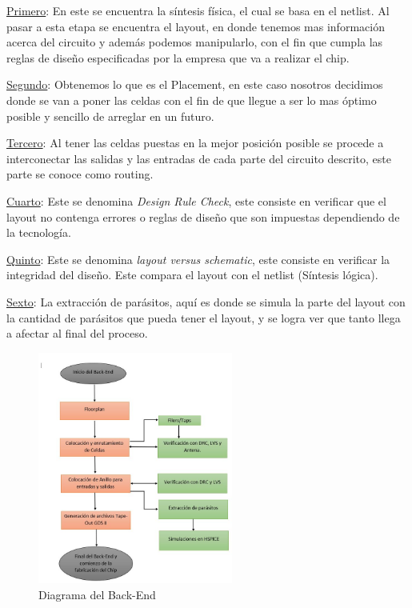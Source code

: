 \underline{Primero}: En este se encuentra la síntesis física, el cual se basa en el netlist. Al pasar a esta etapa se encuentra el layout, en donde tenemos mas información acerca del circuito y además podemos manipularlo, con el fin que cumpla las reglas de diseño especificadas por la empresa que va a realizar el chip.

\underline{Segundo}: Obtenemos lo que es el Placement, en este caso nosotros decidimos donde se van a poner las celdas con el fin de que llegue a ser lo mas óptimo posible y sencillo de arreglar en un futuro.

\underline{Tercero}: Al tener las celdas puestas en la mejor posición posible se procede a interconectar las salidas y las entradas de cada parte del circuito descrito, este parte se conoce como routing.

\underline{Cuarto}: Este se denomina \textit{Design Rule Check}, este consiste en verificar que el layout no contenga errores o reglas de diseño que son impuestas dependiendo de la tecnología.

\underline{Quinto}: Este se denomina \textit{layout versus schematic}, este consiste en verificar la integridad del diseño. Este compara el layout con el netlist (Síntesis lógica).

\underline{Sexto}: La extracción de parásitos, aquí es donde se simula la parte del layout con la cantidad de parásitos que pueda tener el layout, y se logra ver que tanto llega a afectar al final del proceso.

 \cite{charls} 
\begin{figure}[t]
    \centering
    \includegraphics[width=0.57\textwidth]{figuras/Back.JPG}
    \caption{Diagrama del Back-End}
    \label{fig:mesh1}
\end{figure}

